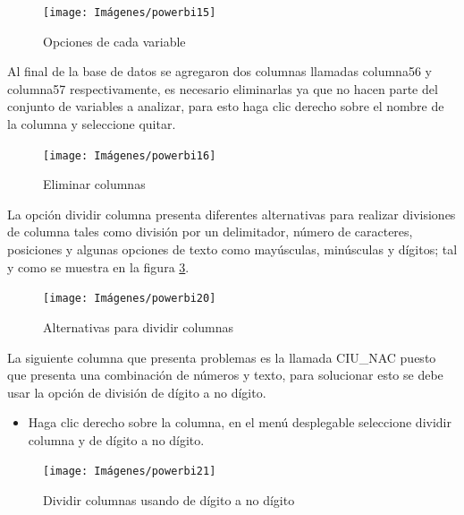 \documentclass[
]{book}
\providecommand{\tightlist}{%
  \setlength{\itemsep}{0pt}\setlength{\parskip}{0pt}}
\begin{document}
\begin{figure}

{\centering \texttt{[image: Imágenes/powerbi15]} 

}

\caption{Opciones de cada variable}\label{fig:opcionesdecolumna-fig}
\end{figure}

Al final de la base de datos se agregaron dos columnas llamadas columna56 y columna57 respectivamente, es necesario eliminarlas ya que no hacen parte del conjunto de variables a analizar, para esto haga clic derecho sobre el nombre de la columna y seleccione quitar.

\begin{figure}

{\centering \texttt{[image: Imágenes/powerbi16]} 

}

\caption{Eliminar columnas}\label{fig:quitarcolumnas-fig}
\end{figure}

La opción dividir columna presenta diferentes alternativas para realizar divisiones de columna tales como división por un delimitador, número de caracteres, posiciones y algunas opciones de texto como mayúsculas, minúsculas y dígitos; tal y como se muestra en la figura \ref{fig:opcionesdedivision-fig}.

\begin{figure}

{\centering \texttt{[image: Imágenes/powerbi20]} 

}

\caption{Alternativas para dividir columnas}\label{fig:opcionesdedivision-fig}
\end{figure}

La siguiente columna que presenta problemas es la llamada CIU\_NAC puesto que presenta una combinación de números y texto, para solucionar esto se debe usar la opción de división de dígito a no dígito.

\begin{itemize}
\tightlist
\item
  Haga clic derecho sobre la columna, en el menú desplegable seleccione dividir columna y de dígito a no dígito.
\end{itemize}

\begin{figure}

{\centering \texttt{[image: Imágenes/powerbi21]} 

}

\caption{Dividir columnas usando de dígito a no dígito}\label{fig:dividirdigitoanodigito-fig}
\end{figure}
\end{document}
